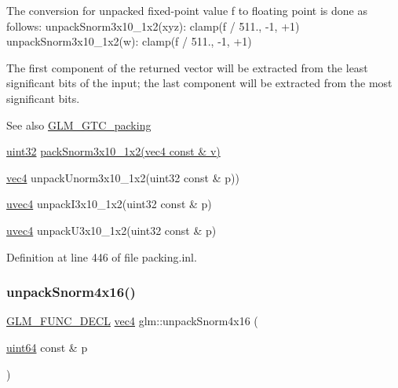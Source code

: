The conversion for unpacked fixed-\/point value f to floating point is done as follows\+: unpack\+Snorm3x10\+\_\+1x2(xyz)\+: clamp(f / 511., -\/1, +1) unpack\+Snorm3x10\+\_\+1x2(w)\+: clamp(f / 511., -\/1, +1)

The first component of the returned vector will be extracted from the least significant bits of the input; the last component will be extracted from the most significant bits.

\begin{DoxySeeAlso}{See also}
\hyperlink{group__gtc__packing}{G\+L\+M\+\_\+\+G\+T\+C\+\_\+packing} 

\hyperlink{group__gtc__type__precision_ga202b6a53c105fcb7e531f9b443518451}{uint32} \hyperlink{group__gtc__packing_ga0d4157cec37c0312216a7be1cc92df54}{pack\+Snorm3x10\+\_\+1x2(vec4 const \& v)} 

\hyperlink{group__core__types_ga5881b1b022d7fd1b7218f5916532dd02}{vec4} unpack\+Unorm3x10\+\_\+1x2(uint32 const \& p)) 

\hyperlink{group__core__types_ga1c426d19627b32b14f0089f7f4ba7b1d}{uvec4} unpack\+I3x10\+\_\+1x2(uint32 const \& p) 

\hyperlink{group__core__types_ga1c426d19627b32b14f0089f7f4ba7b1d}{uvec4} unpack\+U3x10\+\_\+1x2(uint32 const \& p) 
\end{DoxySeeAlso}


Definition at line 446 of file packing.\+inl.

\mbox{\label{group__gtc__packing_gadb01fc0530f07beb509c89d97b6f4d20}} 
\subsubsection{\texorpdfstring{unpack\+Snorm4x16()}{unpackSnorm4x16()}}
{\footnotesize\ttfamily \hyperlink{setup_8hpp_ab2d052de21a70539923e9bcbf6e83a51}{G\+L\+M\+\_\+\+F\+U\+N\+C\+\_\+\+D\+E\+CL} \hyperlink{group__core__types_ga5881b1b022d7fd1b7218f5916532dd02}{vec4} glm\+::unpack\+Snorm4x16 (\begin{DoxyParamCaption}\item[{\hyperlink{group__gtc__type__precision_gae3632bf9b37da66233d78930dd06378a}{uint64} const \&}]{p }\end{DoxyParamCaption})}

